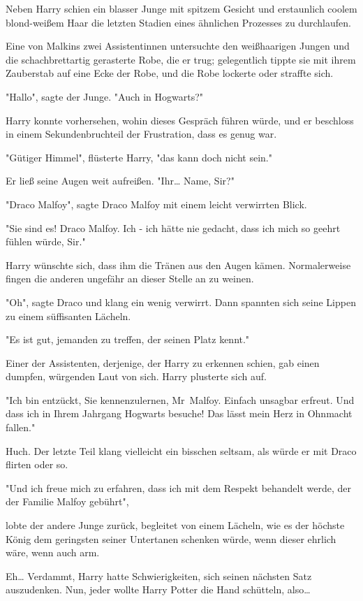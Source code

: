 {Neben Harry schien ein blasser Junge mit spitzem Gesicht und erstaunlich coolem blond-weißem Haar die letzten Stadien eines ähnlichen Prozesses zu durchlaufen.

Eine von Malkins zwei Assistentinnen untersuchte den weißhaarigen Jungen und die schachbrettartig gerasterte Robe, die er trug; gelegentlich tippte sie mit ihrem Zauberstab auf eine Ecke der Robe, und die Robe lockerte oder straffte sich.

"Hallo", sagte der Junge. "Auch in Hogwarts?"

Harry konnte vorhersehen, wohin dieses Gespräch führen würde, und er beschloss in einem Sekundenbruchteil der Frustration, dass es genug war.

"Gütiger Himmel", flüsterte Harry, "das kann doch nicht sein."

Er ließ seine Augen weit aufreißen. "Ihr… Name, Sir?"

"Draco Malfoy", sagte Draco Malfoy mit einem leicht verwirrten Blick.

"Sie sind es! Draco Malfoy. Ich - ich hätte nie gedacht, dass ich mich so geehrt fühlen würde, Sir."

Harry wünschte sich, dass ihm die Tränen aus den Augen kämen. Normalerweise fingen die anderen ungefähr an dieser Stelle an zu weinen.

"Oh", sagte Draco und klang ein wenig verwirrt. Dann spannten sich seine Lippen zu einem süffisanten Lächeln.

"Es ist gut, jemanden zu treffen, der seinen Platz kennt."

Einer der Assistenten, derjenige, der Harry zu erkennen schien, gab einen dumpfen, würgenden Laut von sich. Harry plusterte sich auf.

"Ich bin entzückt, Sie kennenzulernen, Mr~Malfoy. Einfach unsagbar erfreut. Und dass ich in Ihrem Jahrgang Hogwarts besuche! Das lässt mein Herz in Ohnmacht fallen."

Huch. Der letzte Teil klang vielleicht ein bisschen seltsam, als würde er mit Draco flirten oder so.

"Und ich freue mich zu erfahren, dass ich mit dem Respekt behandelt werde, der der Familie Malfoy gebührt",

lobte der andere Junge zurück, begleitet von einem Lächeln, wie es der höchste König dem geringsten seiner Untertanen schenken würde, wenn dieser ehrlich wäre, wenn auch arm.

Eh… Verdammt, Harry hatte Schwierigkeiten, sich seinen nächsten Satz auszudenken. Nun, jeder wollte Harry Potter die Hand schütteln, also…

}
